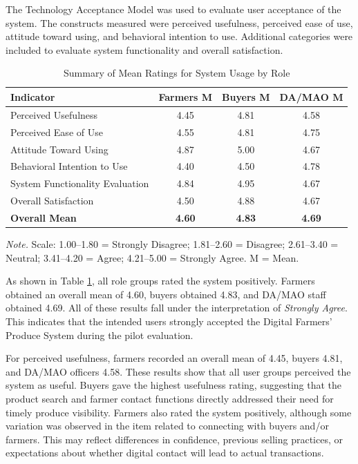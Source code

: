 The Technology Acceptance Model was used to evaluate user acceptance of the system. The constructs measured were perceived usefulness, perceived ease of use, attitude toward using, and behavioral intention to use. Additional categories were included to evaluate system functionality and overall satisfaction.

\begin{table}[htbp]
\vspace{2ex}
\centering
\caption{Summary of Mean Ratings for System Usage by Role}
\label{table:summary-mean-ratings}
\begin{tabular}{p{4.6cm}ccc}
\hline
\hline
\textbf{Indicator} & \textbf{Farmers M} & \textbf{Buyers M} & \textbf{DA/MAO M} \\
\hline
Perceived Usefulness & 4.45 & 4.81 & 4.58 \\
Perceived Ease of Use & 4.55 & 4.81 & 4.75 \\
Attitude Toward Using & 4.87 & 5.00 & 4.67 \\
Behavioral Intention to Use & 4.40 & 4.50 & 4.78 \\
System Functionality Evaluation & 4.84 & 4.95 & 4.67 \\
Overall Satisfaction & 4.50 & 4.88 & 4.67 \\
\hline
\textbf{Overall Mean} & \textbf{4.60} & \textbf{4.83} & \textbf{4.69} \\
\hline
\hline
\end{tabular}
\vspace{1ex}

\begin{flushleft}
\footnotesize{\textit{Note.} Scale: 1.00--1.80 = Strongly Disagree; 1.81--2.60 = Disagree; 2.61--3.40 = Neutral; 3.41--4.20 = Agree; 4.21--5.00 = Strongly Agree. M = Mean.}
\end{flushleft}
\vspace{2ex}
\end{table}

As shown in Table \ref{table:summary-mean-ratings}, all role groups rated the system positively. Farmers obtained an overall mean of 4.60, buyers obtained 4.83, and DA/MAO staff obtained 4.69. All of these results fall under the interpretation of \textit{Strongly Agree}. This indicates that the intended users strongly accepted the Digital Farmers' Produce System during the pilot evaluation.

For perceived usefulness, farmers recorded an overall mean of 4.45, buyers 4.81, and DA/MAO officers 4.58. These results show that all user groups perceived the system as useful. Buyers gave the highest usefulness rating, suggesting that the product search and farmer contact functions directly addressed their need for timely produce visibility. Farmers also rated the system positively, although some variation was observed in the item related to connecting with buyers and/or farmers. This may reflect differences in confidence, previous selling practices, or expectations about whether digital contact will lead to actual transactions.

